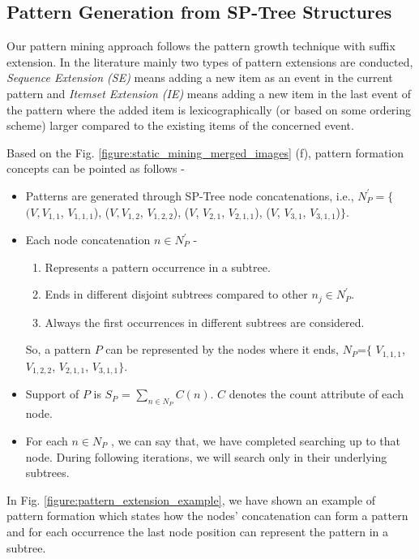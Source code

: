 \subsection{Pattern Generation from SP-Tree Structures}
Our pattern mining approach follows the pattern growth technique with suffix extension. In the literature mainly two types of pattern extensions are conducted, \textit{Sequence Extension (SE)} means adding a new item as an event in the current pattern and \textit{Itemset Extension (IE)} means adding a new item in the last event of the pattern where the added item is lexicographically (or based on some ordering scheme) larger compared to the existing items of the concerned event.
\begin{definition} \label{defintion:pattern_formation}
     Based on the Fig. \ref{figure:static_mining_merged_images} (f), pattern formation concepts can be pointed as follows -
    \begin{itemize}
        \item Patterns are generated through SP-Tree node concatenations,
i.e., $N_{P}^{\prime}=\{$ $(V, V_{1,1}$, $V_{1,1,1}$), ($V, V_{1,2}$, $V_{1,2,2}$),  ($V$, $V_{2,1}$, $V_{2,1,1}$), ($V$, $V_{3,1}$, $V_{3,1,1}$)$\}$.
    \item Each node concatenation $n  \in  N_{P}^{\prime}$ -
        \begin{enumerate}
            \item Represents a pattern occurrence in a subtree.
            \item Ends in different disjoint subtrees compared to other $n_{j}  \in N_{P}^{\prime}$.
            \item Always the first occurrences in different subtrees are considered.
        \end{enumerate}
         So, a pattern $P$ can be represented by the nodes where it ends,  $N_{P}$=$\{$ $V_{1,1,1}$,  $V_{1,2,2}$,  $V_{2,1,1}$,   $V_{3,1,1}\}$.
    \item Support of $P$ is $S_{P}$ =  $\sum_{n \in N_{P}} C(n)$. $C$ denotes the count attribute of each node.
    \item For each $n \in N_{P}$ , we can say that, we have completed searching up to that node. During following iterations, we will search only in their underlying subtrees.
    \end{itemize}
\end{definition}

In Fig. \ref{figure:pattern_extension_example}, we have shown an example of pattern formation which states how the nodes' concatenation can form a pattern and for each occurrence the last node position can represent the pattern in a subtree.

